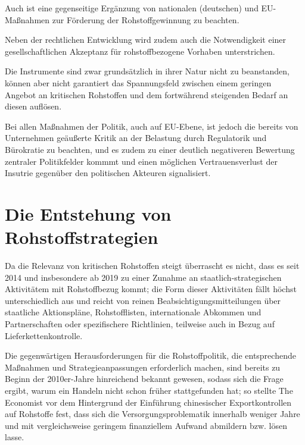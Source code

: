 \documentclass[12pt,a4paper,oneside]{book} %
\begin{document}
Auch ist eine gegenseitige Ergänzung von nationalen (deutschen) und EU-Maßnahmen zur Förderung der Rohstoffgewinnung zu beachten.\autocite{Fremz 2025, S. 317.}

Neben der rechtlichen Entwicklung wird zudem auch die Notwendigkeit einer gesellschaftlichen Akzeptanz für rohstoffbezogene Vorhaben unterstrichen.\autocite{Frenz 2025, S. 319}

Die Instrumente sind zwar grundsätzlich in ihrer Natur nicht zu beanstanden, können aber nicht garantiert das Spannungsfeld zwischen einem geringen Angebot an kritischen Rohstoffen und dem fortwährend steigenden Bedarf an diesen auflösen.\autocite{Frenz 2025, S. 758}

Bei allen Maßnahmen der Politik, auch auf EU-Ebene, ist jedoch die bereits von Unternehmen geäußerte Kritik an der Belastung durch Regulatorik und Bürokratie zu beachten, und es zudem zu einer deutlich negativeren Bewertung zentraler Politikfelder kommmt und einen möglichen Vertrauensverlust der Insutrie gegenüber den politischen Akteuren signalisiert.\autocite{BME-Frühjahrsbarometer 2026, Deutsche Wirtschaft und Beschaffung unter Dauerstress}

\section{Die Entstehung von Rohstoffstrategien}
Da die Relevanz von kritischen Rohstoffen steigt überrascht es nicht, dass es seit 2014 und insbesondere ab 2019 zu einer Zunahme an staatlich-strategischen Aktivitätem mit Rohstoffbezug kommt;\autocite{Resilience of Critical Minerals Supply Chain, Cambirdge, S. 20} die Form dieser Aktivitäten fällt höchst unterschiedlich aus und reicht von reinen Beabsichtigungsmitteilungen über staatliche Aktionspläne, Rohstofflisten, internationale Abkommen und Partnerschaften oder spezifischere Richtlinien, teilweise auch in Bezug auf Lieferkettenkontrolle.

Die gegenwärtigen Herausforderungen für die Rohstoffpolitik, die entsprechende Maßnahmen und Strategieanpassungen erforderlich machen, sind bereits zu Beginn der 2010er-Jahre hinreichend bekannt gewesen, sodass sich die Frage ergibt, warum ein Handeln nicht schon früher stattgefunden hat; so stellte The Economist vor dem Hintergrund der Einführung chinesischer Exportkontrollen auf Rohstoffe fest, dass sich die Versorgungsproblematik innerhalb weniger Jahre und mit vergleichsweise geringem finanziellem Aufwand abmildern bzw. lösen lasse.\autocite{https://www.economist.com/finance-and-economics/2010/09/02/digging-in}
\end{document}
